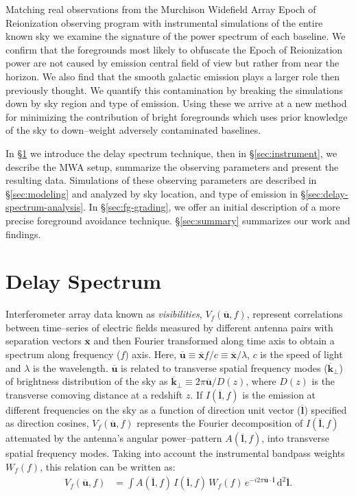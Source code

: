 \documentclass[preprint2,iop,numberedappendix]{emulateapj}
\newcommand{\dif}{\mathrm{d}}
\begin{document}
 Matching real observations from the Murchison Widefield Array Epoch of Reionization observing program with instrumental simulations of the entire known sky we examine the signature of the power spectrum of each baseline. We confirm that the foregrounds most likely to obfuscate the Epoch of Reionization power are not caused by emission central field of view but rather from near the horizon. We also find that the smooth galactic emission plays a larger role then previously thought. We quantify this contamination by breaking the simulations down by sky region and type of emission. Using these we arrive at a new method for minimizing the contribution of bright foregrounds which uses prior knowledge of the sky to down--weight adversely contaminated baselines.

In \S\ref{sec:delay-spectrum} we introduce the delay spectrum technique, then in  \S\ref{sec:instrument}, we describe the MWA setup, summarize the observing parameters and present the resulting data. Simulations of these observing parameters are described in \S\ref{sec:modeling} and analyzed by sky location, and type of emission in \S\ref{sec:delay-spectrum-analysis}. In \S\ref{sec:fg-grading}, we offer an initial description of a more precise foreground avoidance technique. \S\ref{sec:summary} summarizes our work and findings.

\section{Delay Spectrum}\label{sec:delay-spectrum}

Interferometer array data known as {\it visibilities}, $V_f(\overline{\mathbf{u}},f)$, represent correlations between time--series of electric fields measured by different antenna pairs with separation vectors $\overline{\mathbf{x}}$ and then Fourier transformed along time axis to obtain a spectrum along frequency ($f$) axis. Here, $\overline{\mathbf{u}}\equiv \overline{\mathbf{x}}f/c \equiv \overline{\mathbf{x}}/\lambda$, $c$ is the speed of light and $\lambda$ is the wavelength. $\overline{\mathbf{u}}$ is related to transverse spatial frequency modes ($\overline{\mathbf{k}}_\perp$) of brightness distribution of the sky as $\overline{\mathbf{k}}_\perp \equiv 2\pi\overline{\mathbf{u}}/D(z)$, where $D(z)$ is the transverse comoving distance at a redshift $z$. If $I(\overline{\mathbf{l}},f)$ is the emission at different frequencies on the sky as a function of direction unit vector ($\overline{\mathbf{l}}$) specified as direction cosines, $V_f(\overline{\mathbf{u}},f)$ represents the Fourier decomposition of $I(\overline{\mathbf{l}},f)$ attenuated by the antenna's angular power--pattern $A(\overline{\mathbf{l}},f)$, into transverse spatial frequency modes. Taking into account the instrumental bandpass weights $W_f(f)$, this relation can be written as:
\begin{align}\label{eqn:obsvis}
  V_f(\overline{\mathbf{u}},f) &= \int A(\overline{\mathbf{l}},f)\,I(\overline{\mathbf{l}},f)\,W_f(f)\,e^{-i2\pi \overline{\mathbf{u}}\cdot\overline{\mathbf{l}}}\,\dif^2 \overline{\mathbf{l}}.
\end{align}
\end{document}
